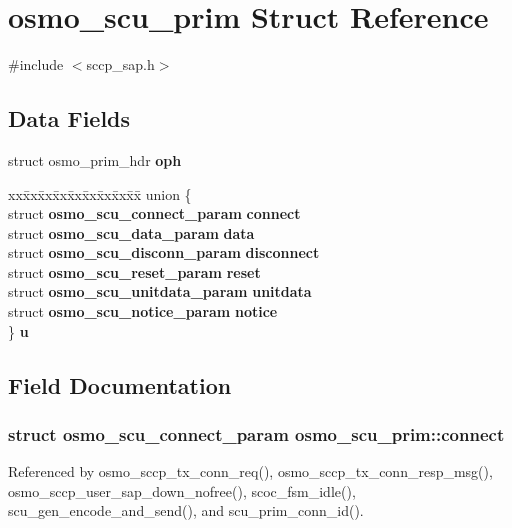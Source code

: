 \section{osmo\+\_\+scu\+\_\+prim Struct Reference}
\label{structosmo__scu__prim}


{\ttfamily \#include $<$sccp\+\_\+sap.\+h$>$}

\subsection*{Data Fields}
\begin{DoxyCompactItemize}
\item 
struct osmo\+\_\+prim\+\_\+hdr {\bf oph}
\item 
\begin{tabbing}
xx\=xx\=xx\=xx\=xx\=xx\=xx\=xx\=xx\=\kill
union \{\\
\>struct {\bf osmo\_scu\_connect\_param} {\bf connect}\\
\>struct {\bf osmo\_scu\_data\_param} {\bf data}\\
\>struct {\bf osmo\_scu\_disconn\_param} {\bf disconnect}\\
\>struct {\bf osmo\_scu\_reset\_param} {\bf reset}\\
\>struct {\bf osmo\_scu\_unitdata\_param} {\bf unitdata}\\
\>struct {\bf osmo\_scu\_notice\_param} {\bf notice}\\
\} {\bf u}\\

\end{tabbing}\end{DoxyCompactItemize}


\subsection{Field Documentation}
\subsubsection[{connect}]{\setlength{\rightskip}{0pt plus 5cm}struct {\bf osmo\+\_\+scu\+\_\+connect\+\_\+param} osmo\+\_\+scu\+\_\+prim\+::connect}\label{structosmo__scu__prim_a906d0ffd0b404f75076123db2ba80f97}


Referenced by osmo\+\_\+sccp\+\_\+tx\+\_\+conn\+\_\+req(), osmo\+\_\+sccp\+\_\+tx\+\_\+conn\+\_\+resp\+\_\+msg(), osmo\+\_\+sccp\+\_\+user\+\_\+sap\+\_\+down\+\_\+nofree(), scoc\+\_\+fsm\+\_\+idle(), scu\+\_\+gen\+\_\+encode\+\_\+and\+\_\+send(), and scu\+\_\+prim\+\_\+conn\+\_\+id().


